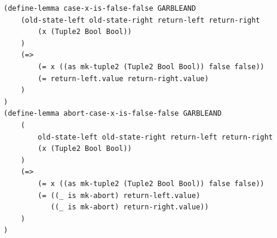 \begin{longlisting}
\begin{verbatim}
(define-lemma case-x-is-false-false GARBLEAND
    (old-state-left old-state-right return-left return-right
        (x (Tuple2 Bool Bool))
    )
    (=>
        (= x ((as mk-tuple2 (Tuple2 Bool Bool)) false false))
        (= return-left.value return-right.value)
    )
)
(define-lemma abort-case-x-is-false-false GARBLEAND
    (
        old-state-left old-state-right return-left return-right
        (x (Tuple2 Bool Bool))
    )
    (=>
        (= x ((as mk-tuple2 (Tuple2 Bool Bool)) false false))
        (= ((_ is mk-abort) return-left.value)
           ((_ is mk-abort) return-right.value))
    )
)
\end{verbatim}
\caption{One of four lemma pairs in game hop 5 of the  theorem}
\label{lst:domino-freexor-gamehop4-lemma}
\end{longlisting}